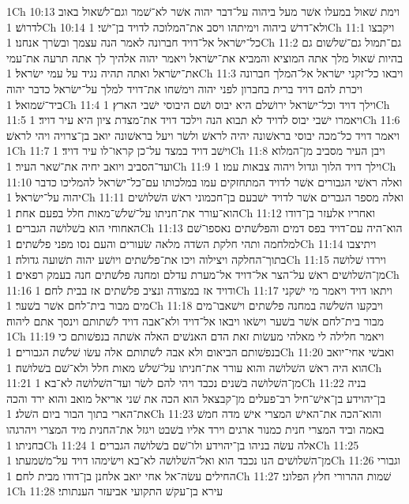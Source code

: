 1Ch 10:13  וימת שׁאול במעלו אשׁר מעל ביהוה על־דבר יהוה אשׁר לא־שׁמר וגם־לשׁאול באוב לדרושׁ׃
1Ch 10:14  ולא־דרשׁ ביהוה וימיתהו ויסב את־המלוכה לדויד בן־ישׁי׃
1Ch 11:1  ויקבצו כל־ישׂראל אל־דויד חברונה לאמר הנה עצמך ובשׂרך אנחנו׃
1Ch 11:2  גם־תמול גם־שׁלשׁום גם בהיות שׁאול מלך אתה המוציא והמביא את־ישׂראל ויאמר יהוה אלהיך לך אתה תרעה את־עמי את־ישׂראל ואתה תהיה נגיד על עמי ישׂראל׃
1Ch 11:3  ויבאו כל־זקני ישׂראל אל־המלך חברונה ויכרת להם דויד ברית בחברון לפני יהוה וימשׁחו את־דויד למלך על־ישׂראל כדבר יהוה ביד־שׁמואל׃
1Ch 11:4  וילך דויד וכל־ישׂראל ירושׁלם היא יבוס ושׁם היבוסי ישׁבי הארץ׃
1Ch 11:5  ויאמרו ישׁבי יבוס לדויד לא תבוא הנה וילכד דויד את־מצדת ציון היא עיר דויד׃
1Ch 11:6  ויאמר דויד כל־מכה יבוסי בראשׁונה יהיה לראשׁ ולשׂר ויעל בראשׁונה יואב בן־צרויה ויהי לראשׁ׃
1Ch 11:7  וישׁב דויד במצד על־כן קראו־לו עיר דויד׃
1Ch 11:8  ויבן העיר מסביב מן־המלוא ועד־הסביב ויואב יחיה את־שׁאר העיר׃
1Ch 11:9  וילך דויד הלוך וגדול ויהוה צבאות עמו׃
1Ch 11:10  ואלה ראשׁי הגבורים אשׁר לדויד המתחזקים עמו במלכותו עם־כל־ישׂראל להמליכו כדבר יהוה על־ישׂראל׃
1Ch 11:11  ואלה מספר הגברים אשׁר לדויד ישׁבעם בן־חכמוני ראשׁ השׁלושׁים הוא־עורר את־חניתו על־שׁלשׁ־מאות חלל בפעם אחת׃
1Ch 11:12  ואחריו אלעזר בן־דודו האחוחי הוא בשׁלושׁה הגברים׃
1Ch 11:13  הוא־היה עם־דויד בפס דמים והפלשׁתים נאספו־שׁם למלחמה ותהי חלקת השׂדה מלאה שׂעורים והעם נסו מפני פלשׁתים׃
1Ch 11:14  ויתיצבו בתוך־החלקה ויצילוה ויכו את־פלשׁתים ויושׁע יהוה תשׁועה גדולה׃
1Ch 11:15  וירדו שׁלושׁה מן־השׁלושׁים ראשׁ על־הצר אל־דויד אל־מערת עדלם ומחנה פלשׁתים חנה בעמק רפאים׃
1Ch 11:16  ודויד אז במצודה ונציב פלשׁתים אז בבית לחם׃
1Ch 11:17  ויתאו דויד ויאמר מי ישׁקני מים מבור בית־לחם אשׁר בשׁער׃
1Ch 11:18  ויבקעו השׁלשׁה במחנה פלשׁתים וישׁאבו־מים מבור בית־לחם אשׁר בשׁער וישׂאו ויבאו אל־דויד ולא־אבה דויד לשׁתותם וינסך אתם ליהוה׃
1Ch 11:19  ויאמר חלילה לי מאלהי מעשׂות זאת הדם האנשׁים האלה אשׁתה בנפשׁותם כי בנפשׁותם הביאום ולא אבה לשׁתותם אלה עשׂו שׁלשׁת הגבורים׃
1Ch 11:20  ואבשׁי אחי־יואב הוא היה ראשׁ השׁלושׁה והוא עורר את־חניתו על־שׁלשׁ מאות חלל ולא־שׁם בשׁלושׁה׃
1Ch 11:21  מן־השׁלושׁה בשׁנים נכבד ויהי להם לשׂר ועד־השׁלושׁה לא־בא׃
1Ch 11:22  בניה בן־יהוידע בן־אישׁ־חיל רב־פעלים מן־קבצאל הוא הכה את שׁני אריאל מואב והוא ירד והכה את־הארי בתוך הבור ביום השׁלג׃
1Ch 11:23  והוא־הכה את־האישׁ המצרי אישׁ מדה חמשׁ באמה וביד המצרי חנית כמנור ארגים וירד אליו בשׁבט ויגזל את־החנית מיד המצרי ויהרגהו בחניתו׃
1Ch 11:24  אלה עשׂה בניהו בן־יהוידע ולו־שׁם בשׁלושׁה הגברים׃
1Ch 11:25  מן־השׁלושׁים הנו נכבד הוא ואל־השׁלושׁה לא־בא וישׂימהו דויד על־משׁמעתו׃
1Ch 11:26  וגבורי החילים עשׂה־אל אחי יואב אלחנן בן־דודו מבית לחם׃
1Ch 11:27  שׁמות ההרורי חלץ הפלוני׃
1Ch 11:28  עירא בן־עקשׁ התקועי אביעזר הענתותי׃

